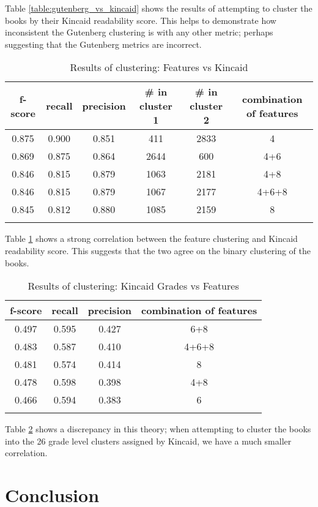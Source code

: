 \documentclass[]{article}
\begin{document}
Table \ref{table:gutenberg_vs_kincaid} shows the results of attempting to cluster the books by their Kincaid readability score.
This helps to demonstrate how inconsistent the Gutenberg clustering is with any other metric; perhaps suggesting that the Gutenberg metrics are incorrect.

\begin{longtable}[!htbp]{| c | c | c | c | c | c |} \hline
	f-score & recall & precision & \# in cluster 1 & \# in cluster 2 & combination of features \\
	\hline
	0.875 & 0.900 & 0.851 & 411 & 2833 & 4 \\ 
	0.869 & 0.875 & 0.864 & 2644 & 600 & 4+6 \\
	0.846 & 0.815 & 0.879 & 1063 & 2181 & 4+8 \\
	0.846 & 0.815 & 0.879 & 1067 & 2177 & 4+6+8 \\
	0.845 & 0.812 & 0.880 & 1085 & 2159 & 8 \\
	\hline
	\caption{Results of clustering: Features vs Kincaid}
	\label{table:features_vs_kincaid}
\end{longtable}

\clearpage

Table \ref{table:features_vs_kincaid} shows a strong correlation between the feature clustering and Kincaid readability score.
This suggests that the two agree on the binary clustering of the books.

\begin{longtable}[!htbp]{| c | c | c | c |} \hline
	f-score & recall & precision & combination of features \\
	\hline
	0.497 & 0.595 & 0.427 & 6+8 \\
	0.483 & 0.587 & 0.410 & 4+6+8 \\
	0.481 & 0.574 & 0.414 & 8 \\
	0.478 & 0.598 & 0.398 & 4+8 \\
	0.466 & 0.594 & 0.383 & 6 \\
	\hline
	\caption{Results of clustering: Kincaid Grades vs Features}
	\label{table:kincaid_clustering}
\end{longtable}

Table \ref{table:kincaid_clustering} shows a discrepancy in this theory; when attempting to cluster the books into the 26 grade level clusters assigned by Kincaid, we have a much smaller correlation.


\section{Conclusion}
\end{document}
